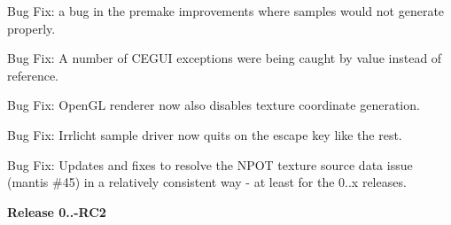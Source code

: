 \begin{DoxyItemize}
\item Bug Fix\+: a bug in the premake improvements where samples would not generate properly.
\item Bug Fix\+: A number of C\+E\+G\+UI exceptions were being caught by value instead of reference.
\item Bug Fix\+: Open\+GL renderer now also disables texture coordinate generation.
\item Bug Fix\+: Irrlicht sample driver now quits on the escape key like the rest.
\item Bug Fix\+: Updates and fixes to resolve the N\+P\+OT texture source data issue (mantis \#45) in a relatively consistent way -\/ at least for the 0..\+x releases.
\end{DoxyItemize}

{\bfseries{Release 0..-\/R\+C2}}
